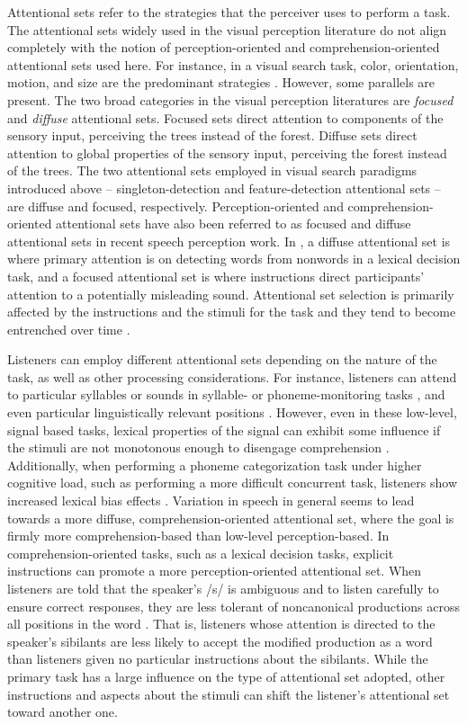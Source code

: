 Attentional sets refer to the strategies that the perceiver uses to perform a task.
The attentional sets widely used in the visual perception literature do not align completely with the notion of perception-oriented and comprehension-oriented attentional sets used here.
For instance, in a visual search task, color, orientation, motion, and size are the predominant strategies \citep{Wolfe2004}.
However, some parallels are present.
The two broad categories in the visual perception literatures are \emph{focused} and \emph{diffuse} attentional sets.
Focused sets direct attention to components of the sensory input, perceiving the trees instead of the forest. 
Diffuse sets direct attention to global properties of the sensory input, perceiving the forest instead of the trees.  
The two attentional sets employed in visual search paradigms introduced above -- singleton-detection and feature-detection attentional sets -- are diffuse and focused, respectively.
Perception-oriented and comprehension-oriented attentional sets have also been referred to as focused and diffuse attentional sets in recent speech perception work.
In \citet{Pitt2012}, a diffuse attentional set is where primary attention is on detecting words from nonwords in a lexical decision task, and a focused attentional set is where instructions direct participants' attention to a potentially misleading sound.
Attentional set selection is primarily affected by the instructions and the stimuli for the task and they tend to become entrenched over time \citep{Leber2006}.

Listeners can employ different attentional sets depending on the nature of the task, as well as other processing considerations.
For instance, listeners can attend to particular syllables or sounds in syllable- or phoneme-monitoring tasks \citep[and others]{Norris1988}, and even particular linguistically relevant positions \citep{Pitt1990}.
However, even in these low-level, signal based tasks, lexical properties of the signal can exhibit some influence if the stimuli are not monotonous enough to disengage comprehension \citep{Cutler1987}.  
Additionally, when performing a phoneme categorization task under higher cognitive load, such as performing a more difficult concurrent task, listeners show increased lexical bias effects \citep{Mattys2011}.
Variation in speech in general seems to lead towards a more diffuse, comprehension-oriented attentional set, where the goal is firmly more comprehension-based than low-level perception-based.
In comprehension-oriented tasks, such as a lexical decision tasks, explicit instructions can promote a more perception-oriented attentional set.
When listeners are told that the speaker's /s/ is ambiguous and to listen carefully to ensure correct responses, they are less tolerant of noncanonical productions across all positions in the word \citep{Pitt2012}.  
That is, listeners whose attention is directed to the speaker's sibilants are less likely to accept the modified production as a word than listeners given no particular instructions about the sibilants.
While the primary task has a large influence on the type of attentional set adopted, other instructions and aspects about the stimuli can shift the listener's attentional set toward another one.

